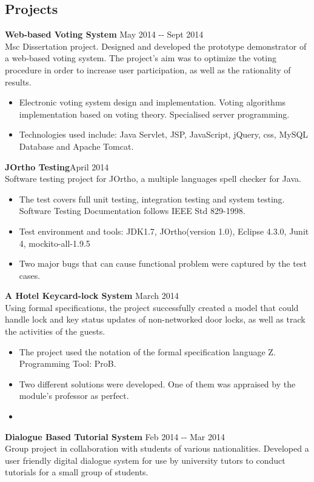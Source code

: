 \documentclass[margin]{res}
\begin{document}
\begin{resume}
\section{Projects}
{\bf Web-based Voting System} \hfill May 2014 -­‐ Sept 2014\\
Msc Dissertation
project. Designed and developed the prototype demonstrator of a web-based voting
system. The project's aim was to optimize the voting procedure in order to
increase user participation, as well as the rationality of results.
\begin{itemize}
  \item Electronic voting system design and implementation. Voting algorithms
  implementation based on voting theory. Specialised server programming.
\item Technologies used
include: Java Servlet, JSP, JavaScript, jQuery, css, MySQL Database and Apache
Tomcat.
\end{itemize}
{\bf JOrtho Testing}\hfill April 2014\\
Software testing project for JOrtho, a multiple languages spell checker for
Java.
\begin{itemize}
  \item The test covers full
unit testing, integration testing and system testing. Software Testing
Documentation follows IEEE Std 829-1998. 
\item Test environment and tools: JDK1.7, JOrtho(version 1.0), Eclipse 4.3.0,
Junit 4, mockito-all-1.9.5
\item Two major bugs that can cause functional problem were captured by the test
cases.
\end{itemize}
{\bf A Hotel Keycard-lock System} \hfill March 2014\\
Using formal specifications, the project successfully created a model that could handle lock and key status updates of non-networked door locks, as well as track the activities of the guests.
\begin{itemize}
   \item The project used the notation of the formal specification language Z. Programming Tool: ProB.
   \item Two different solutions were developed. One of them was appraised by the module’s professor as perfect.
   \item 
 \end{itemize}
{\bf Dialogue Based Tutorial System} \hfill Feb 2014 -­‐ Mar 2014\\
Group project in collaboration with students of various nationalities. Developed a user friendly digital dialogue system for use by university tutors to conduct tutorials for a small group of students.

\end{resume}
\end{document}
